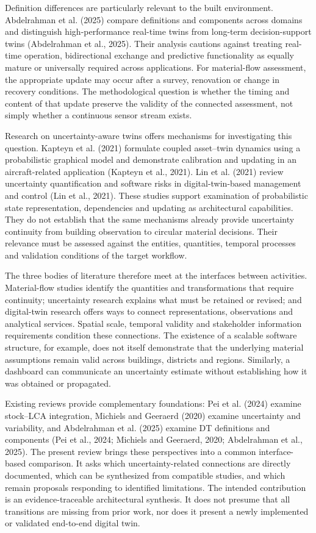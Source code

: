 Definition differences are particularly relevant to the built environment. Abdelrahman et al. (2025) compare definitions and components across domains and distinguish high-performance real-time twins from long-term decision-support twins (Abdelrahman et al., 2025). Their analysis cautions against treating real-time operation, bidirectional exchange and predictive functionality as equally mature or universally required across applications. For material-flow assessment, the appropriate update may occur after a survey, renovation or change in recovery conditions. The methodological question is whether the timing and content of that update preserve the validity of the connected assessment, not simply whether a continuous sensor stream exists.

Research on uncertainty-aware twins offers mechanisms for investigating this question. Kapteyn et al. (2021) formulate coupled asset–twin dynamics using a probabilistic graphical model and demonstrate calibration and updating in an aircraft-related application (Kapteyn et al., 2021). Lin et al. (2021) review uncertainty quantification and software risks in digital-twin-based management and control (Lin et al., 2021). These studies support examination of probabilistic state representation, dependencies and updating as architectural capabilities. They do not establish that the same mechanisms already provide uncertainty continuity from building observation to circular material decisions. Their relevance must be assessed against the entities, quantities, temporal processes and validation conditions of the target workflow.

The three bodies of literature therefore meet at the interfaces between activities. Material-flow studies identify the quantities and transformations that require continuity; uncertainty research explains what must be retained or revised; and digital-twin research offers ways to connect representations, observations and analytical services. Spatial scale, temporal validity and stakeholder information requirements condition these connections. The existence of a scalable software structure, for example, does not itself demonstrate that the underlying material assumptions remain valid across buildings, districts and regions. Similarly, a dashboard can communicate an uncertainty estimate without establishing how it was obtained or propagated.

Existing reviews provide complementary foundations: Pei et al. (2024) examine stock–LCA integration, Michiels and Geeraerd (2020) examine uncertainty and variability, and Abdelrahman et al. (2025) examine DT definitions and components (Pei et al., 2024; Michiels and Geeraerd, 2020; Abdelrahman et al., 2025). The present review brings these perspectives into a common interface-based comparison. It asks which uncertainty-related connections are directly documented, which can be synthesized from compatible studies, and which remain proposals responding to identified limitations. The intended contribution is an evidence-traceable architectural synthesis. It does not presume that all transitions are missing from prior work, nor does it present a newly implemented or validated end-to-end digital twin.


